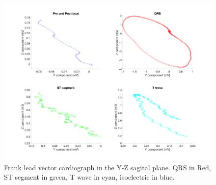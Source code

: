 \documentclass[12pt]{article}
\begin{document}
\begin{figure}[H]
	
	\centering
	\includegraphics[width = .95\textwidth]{Figures/FrankLeads_yz.png}
	\caption{ Frank lead vector cardiograph in the Y-Z sagital plane. QRS in Red, ST segment in green, T wave in cyan, isoelectric in blue.}
	\label{fig:Frank_yz}
\end{figure}
\end{document}
